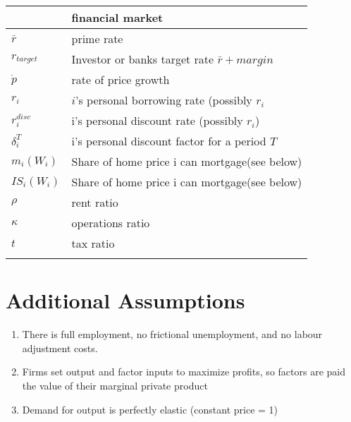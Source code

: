 \begin{longtable}{lp{10cm}}
	& \color{red}\textbf{financial market}\\ \hline
$\bar r$    &  prime rate \\
$r_{target}$ & Investor or banks target rate $\bar r + margin$\\
$\dot p$ & rate of price growth\\
$r_i$ & $i$'s personal borrowing rate (possibly $r_i$\\
$r_i^{disc}$ & i's personal discount rate (possibly $r_i$)\\
$\delta_i^T$ & i's personal discount factor for a period $T$\\
$m_i(W_i)$  &  Share of home price i can mortgage(see below)\\
$IS_i(W_i)$  &  Share of home price i can mortgage(see below)\\
$\rho$  &  rent ratio\\
$\kappa$  &  operations ratio\\
$t$     & tax ratio\\
\hline
\color{black}
\end{longtable}  

\section{Additional Assumptions}
\begin{enumerate}
\item There is full employment, no frictional unemployment, and no labour adjustment costs.
\item Firms set output and factor inputs to maximize profits, so factors are paid the value of their marginal private product
\item Demand for output is perfectly elastic (constant price = 1)

\end{enumerate}

